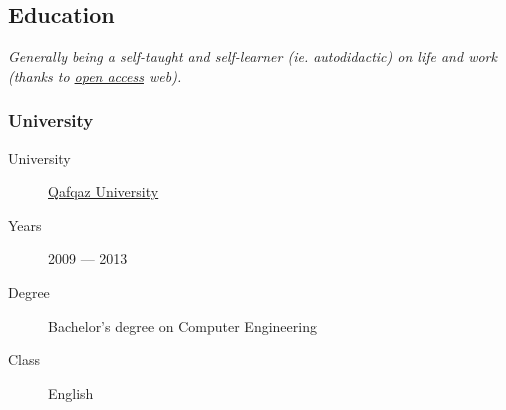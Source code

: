 \documentclass {article}
\begin{document}
    \subsection {Education}
      \textit {Generally being a self-taught and self-learner (ie. autodidactic) on life and work (thanks to \href{https://en.wikipedia.org/wiki/Open_access}{open access} web).}

      \subsubsection {University}
        \begin {description}
          \item [University] \href {https://en.wikipedia.org/wiki/Qafqaz_University} {Qafqaz University}
          \item [Years] 2009 --- 2013
          \item [Degree] Bachelor's degree on Computer Engineering
          \item [Class] English
        \end {description}
\end{document}
